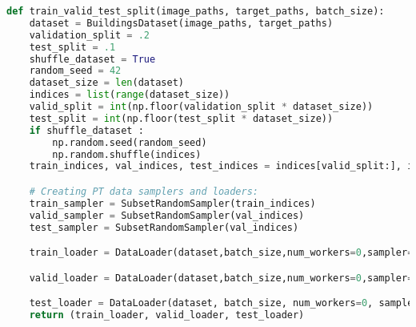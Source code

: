 \begin{lstlisting}[language=Python, caption = {Function to split the training data into train, valid and test PyTorch dataloaders that can in turn be used to train and evaluate the network.}, label={lst.split},float,floatplacement=htbp]
def train_valid_test_split(image_paths, target_paths, batch_size):
    dataset = BuildingsDataset(image_paths, target_paths)
    validation_split = .2
    test_split = .1
    shuffle_dataset = True
    random_seed = 42
    dataset_size = len(dataset)
    indices = list(range(dataset_size))
    valid_split = int(np.floor(validation_split * dataset_size))
    test_split = int(np.floor(test_split * dataset_size))
    if shuffle_dataset :
        np.random.seed(random_seed)
        np.random.shuffle(indices)
    train_indices, val_indices, test_indices = indices[valid_split:], indices[test_split:valid_split], indices[:test_split]

    # Creating PT data samplers and loaders:
    train_sampler = SubsetRandomSampler(train_indices)
    valid_sampler = SubsetRandomSampler(val_indices)
    test_sampler = SubsetRandomSampler(val_indices)

    train_loader = DataLoader(dataset,batch_size,num_workers=0,sampler=train_sampler)

    valid_loader = DataLoader(dataset,batch_size,num_workers=0,sampler=valid_sampler)

    test_loader = DataLoader(dataset, batch_size, num_workers=0, sampler=test_sampler)
    return (train_loader, valid_loader, test_loader)

\end{lstlisting}
